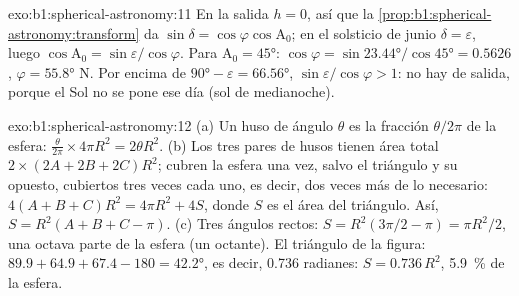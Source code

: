 \begin{solution}{exo:b1:spherical-astronomy:11}
En la salida $h = 0$, así que la \cref{prop:b1:spherical-astronomy:transform} da
$\sin\delta = \cos\varphi\cos\mathrm{A}_0$; en el solsticio de junio
$\delta = \varepsilon$, luego $\cos\mathrm{A}_0 = \sin\varepsilon/\cos\varphi$.
Para $\mathrm{A}_0 = \ang{45}$: $\cos\varphi = \sin\ang{23.44}/\cos\ang{45} =
0.5626$, $\varphi = \ang{55.8}$ N. Por encima de $\ang{90} - \varepsilon =
\ang{66.56}$, $\sin\varepsilon/\cos\varphi > 1$: no hay  de salida, porque el
Sol no se pone ese día (sol de medianoche).
\end{solution}

\begin{solution}{exo:b1:spherical-astronomy:12}
(a) Un huso de ángulo $\theta$ es la fracción $\theta/2\pi$ de la esfera:
$\frac{\theta}{2\pi}\times4\pi R^2 = 2\theta R^2$. (b) Los tres pares de husos
tienen área total $2\times(2A + 2B + 2C)R^2$; cubren la esfera una vez, salvo el
triángulo y su opuesto, cubiertos tres veces cada uno, es decir, dos veces más de
lo necesario: $4(A + B + C)R^2 = 4\pi R^2 + 4S$, donde $S$ es el área del triángulo.
Así, $S = R^2(A + B + C - \pi)$. (c) Tres ángulos rectos: $S = R^2(3\pi/2 - \pi) = \pi R^2/2$, una octava parte de la
esfera (un octante). El triángulo de la figura:
$89.9 + 64.9 + 67.4 - 180 = \ang{42.2}$, es decir, \num{0.736} radianes: $S = 0.736\,R^2$,
\qty{5.9}{\percent} de la esfera.
\end{solution}

